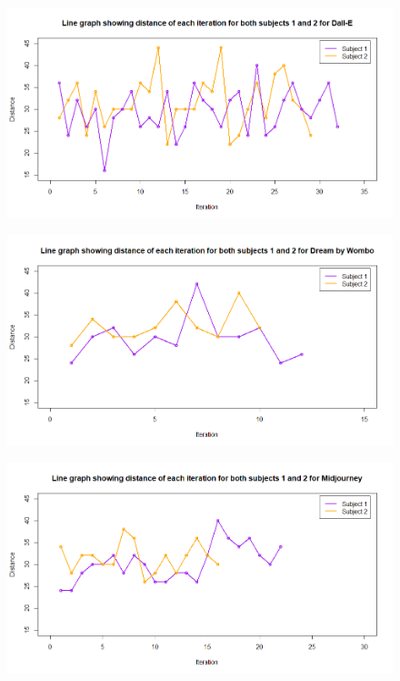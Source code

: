 \documentclass[]{report}
\begin{document}
	\begin{figure}
		\centering
		\includegraphics[width=1\linewidth]{LineGraphDall-E}
		\caption{}
		\label{fig:linegraphdall-e}
	\end{figure}	
	
	\begin{figure}
		\centering
		\includegraphics[width=1\linewidth]{LineGraphDBW}
		\caption{}
		\label{fig:linegraphdbw}
	\end{figure}
	
	
	\begin{figure}
		\centering
		\includegraphics[width=1\linewidth]{LineGraphMidJ}
		\caption{}
		\label{fig:linegraphmidj}
	\end{figure}
	
\end{document}
